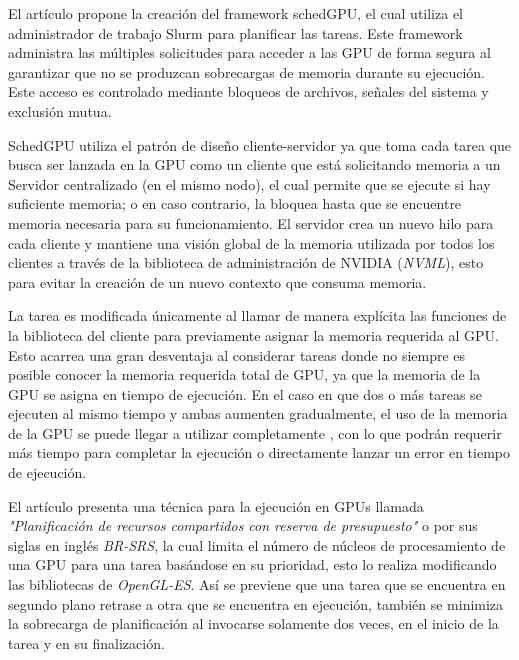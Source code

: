El artículo \cite{IntraNode} propone la creación del framework schedGPU, el cual utiliza el administrador de trabajo Slurm para planificar las tareas. Este framework administra las múltiples solicitudes para acceder a las GPU de forma segura al garantizar que no se produzcan sobrecargas de memoria durante su ejecución. 
Este acceso es controlado mediante bloqueos de archivos, señales del sistema y exclusión mutua.
\newline

SchedGPU utiliza el patrón de diseño cliente-servidor ya que toma cada tarea que busca ser lanzada en la GPU como un cliente que está solicitando memoria a un Servidor centralizado (en el mismo nodo), el cual permite que se ejecute si hay suficiente memoria; o en caso contrario, la bloquea hasta que se encuentre memoria necesaria para su funcionamiento. 
El servidor crea un nuevo hilo para cada cliente y mantiene una visión global de la memoria utilizada por todos los clientes a través de la biblioteca de administración de NVIDIA (\textit{NVML}), esto para evitar la creación de un nuevo contexto que consuma memoria.
\newline

La tarea es modificada únicamente al llamar  de manera explícita las funciones de la biblioteca del cliente para previamente asignar la memoria requerida al GPU. Esto acarrea una gran desventaja al considerar tareas donde no siempre es posible conocer la memoria requerida total de GPU, ya que la memoria de la GPU se asigna en tiempo de ejecución. 
En el caso en que dos o más tareas se ejecuten al mismo tiempo y ambas aumenten gradualmente, el uso de la memoria de la GPU se puede llegar a utilizar completamente , con lo que podrán requerir más tiempo para completar la ejecución o directamente lanzar un error en tiempo de ejecución.
\newline	
	
	El artículo \cite{Pridriven} presenta una técnica para la ejecución en GPUs llamada \textit{"Planificación de recursos compartidos con reserva de presupuesto"} o por sus siglas en inglés \textit{BR-SRS}, la cual limita el número de núcleos de procesamiento de una GPU para una tarea basándose en su prioridad, esto lo realiza modificando las bibliotecas de  \textit{OpenGL-ES}. 
	Así se previene que una tarea que se encuentra en segundo plano retrase a otra que se encuentra en ejecución, también se minimiza la sobrecarga de planificación al invocarse solamente dos veces, en el inicio de la tarea y en su finalización.
\newline

